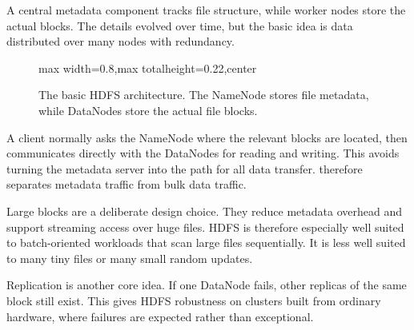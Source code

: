 \documentclass[11pt,a4paper,openany]{book}
\begin{document}
A central metadata component tracks file structure, while worker nodes store the actual blocks. The details evolved over time, but the basic idea is data distributed over many nodes with redundancy.

\begin{figure}[tbp]
\centering
\begin{adjustbox}{max width=0.8\linewidth,max totalheight=0.22\textheight,center}
\end{adjustbox}
\caption{The basic HDFS architecture. The NameNode stores file metadata, while DataNodes store the actual file blocks.}
\label{fig:hdfs-architecture}
\end{figure}

A client normally asks the NameNode where the relevant blocks are located, then communicates directly with the DataNodes for reading and writing. This avoids turning the metadata server into the path for all data transfer.  therefore separates metadata traffic from bulk data traffic.

Large blocks are a deliberate design choice. They reduce metadata overhead and support streaming access over huge files. HDFS is therefore especially well suited to batch-oriented workloads that scan large files sequentially. It is less well suited to many tiny files or many small random updates.

Replication is another core idea. If one DataNode fails, other replicas of the same block still exist. This gives HDFS robustness on clusters built from ordinary hardware, where failures are expected rather than exceptional.
\end{document}
